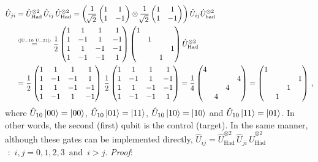 \documentclass[11pt]{article}
\numberwithin{equation}{section} %
\numberwithin{figure}{section} %
\newcommand\numeq[1] %
  {\stackrel{\scriptscriptstyle(\mkern-1.5mu#1\mkern-1.5mu)}{=}}
\begin{document}
\begin{equation} \label{U_CNOT_12}
\begin{split}
\hat{U}_{ji}
&	=\hat{U}_{\textrm{Had}}^{\otimes 2}\,\hat{U}_{ij}\,\hat{U}_{\textrm{Had}}^{\otimes 2}=\left( \frac{1}{\sqrt[]{2}}\begin{pmatrix}1&1\\ 1&-1\end{pmatrix}\otimes \frac{1}{\sqrt[]{2}}\begin{pmatrix}1&1\\ 1&-1\end{pmatrix} \right)\hat{U}_{ij}\hat{U}_{\textrm{had}}^{\otimes 2}\\
&	\numeq{\textrm{\ref{U_10 U_21}}}\frac{1}{2}\begin{pmatrix}1&1&1&1\\ 1&-1&1&-1\\ 1&1&-1&-1\\ 1&-1&-1&1\end{pmatrix} \begin{pmatrix} 1&&&\\ &1&&\\ &&&1\\ &&1&\end{pmatrix} \hat{U}_{\textrm{Had}}^{\otimes 2}\\
&	= \frac{1}{2}\begin{pmatrix}1&1&1&1\\ 1&-1&-1&1\\ 1&1&-1&-1\\ 1&-1&1&-1\end{pmatrix}\,\frac{1}{2}\begin{pmatrix}1&1&1&1\\ 1&-1&1&-1\\ 1&1&-1&-1\\ 1&-1&-1&1\end{pmatrix}=\frac{1}{4}\begin{pmatrix}4&&&\\ &&&4\\ &&4&\\ &4&&\end{pmatrix}= \begin{pmatrix}1&&&\\ &&&1\\ &&1&\\ &1&&\end{pmatrix}\,\textrm{,}
\end{split}
\end{equation}
where $\hat{U}_{10}\ket{00}=\ket{00}$, $\hat{U}_{10}\ket{01}=\ket{11}$, $\hat{U}_{10}\ket{10}=\ket{10}$ and $\hat{U}_{10}\ket{11}=\ket{01}$. In other words, the second (first) qubit is the control (target). In the same manner, although these gates can be implemented directly, $\hat{U}_{ij}=\hat{U}_{\textrm{Had}}^{\otimes 2}\,\hat{U}_{ji}\,\hat{U}_{\textrm{Had}}^{\otimes 2}$ $\textrm{ : } \,i,j=0,1,2,3\,\,\,\textrm{and}\,\,\,i>j\textrm{.}$ \emph{Proof}:
\end{document}
